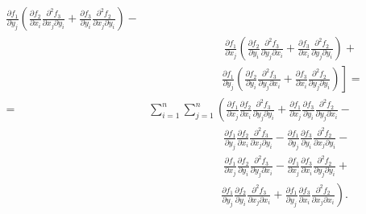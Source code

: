 \begin{align}
\begin{split}
            \frac{\partial f_1}{\partial y_j}\left(
            \frac{\partial f_2}{\partial x_i}
            \frac{\partial^2 f_3}{\partial x_j \partial y_i} +
            \frac{\partial f_3}{\partial y_i}
            \frac{\partial^2 f_2}{\partial x_j \partial y_i}
        \right) - \\
        &\phantom{\sum_{i=1}^{n} \sum_{j=1}^{n} [}\ \ 
            \frac{\partial f_1}{\partial x_j}\left(
            \frac{\partial f_2}{\partial y_i}
            \frac{\partial^2 f_3}{\partial y_j \partial x_i} +
            \frac{\partial f_3}{\partial x_i}
            \frac{\partial^2 f_2}{\partial y_j \partial y_i}
        \right) + \\
        &\phantom{\sum_{i=1}^{n} \sum_{j=1}^{n} [}\ \left.
            \frac{\partial f_1}{\partial y_j}\left(
            \frac{\partial f_2}{\partial y_i}
            \frac{\partial^2 f_3}{\partial y_j \partial x_i} +
            \frac{\partial f_3}{\partial x_i}
            \frac{\partial^2 f_2}{\partial y_j \partial y_i}
        \right)
    \right] = \\
    = &\sum_{i=1}^{n} \sum_{j=1}^{n} \left(
        \frac{\partial f_1}{\partial x_j}
        \frac{\partial f_2}{\partial x_i}
        \frac{\partial^2 f_3}{\partial y_j \partial y_i} +
        \frac{\partial f_1}{\partial x_j}
        \frac{\partial f_3}{\partial y_i}
        \frac{\partial^2 f_2}{\partial y_j \partial x_i} - \right.\\
        &\phantom{\sum_{i=1}^{n} \sum_{j=1}^{n}}\ \ \ 
        \frac{\partial f_1}{\partial y_j}
        \frac{\partial f_2}{\partial x_i}
        \frac{\partial^2 f_3}{\partial x_j \partial y_i} - 
        \frac{\partial f_1}{\partial y_j}
        \frac{\partial f_3}{\partial y_i}
        \frac{\partial^2 f_2}{\partial x_j \partial y_i} - \\
        &\phantom{\sum_{i=1}^{n} \sum_{j=1}^{n}}\ \ \ 
        \frac{\partial f_1}{\partial x_j}
        \frac{\partial f_2}{\partial y_i}
        \frac{\partial^2 f_3}{\partial y_j \partial x_i} -
        \frac{\partial f_1}{\partial x_j}
        \frac{\partial f_3}{\partial x_i}
        \frac{\partial^2 f_2}{\partial y_j \partial y_i} + \\
        &\phantom{\sum_{i=1}^{n} \sum_{j=1}^{n}}\ \ \left.
        \frac{\partial f_1}{\partial y_j}
        \frac{\partial f_2}{\partial y_i}
        \frac{\partial^2 f_3}{\partial x_j \partial x_i} +
        \frac{\partial f_1}{\partial y_j}
        \frac{\partial f_3}{\partial x_i}
        \frac{\partial^2 f_2}{\partial x_j \partial x_i}
    \right).
\end{split}\end{align}


